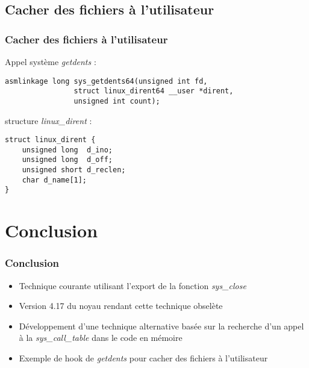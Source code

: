 \documentclass{beamer}
\begin{document}
\subsection{Cacher des fichiers à l'utilisateur}

\begin{frame}[fragile]
\frametitle{Cacher des fichiers à l'utilisateur}
Appel système \textit{getdents} :
\begin{lstlisting}[style=CStyle]
asmlinkage long sys_getdents64(unsigned int fd,
				struct linux_dirent64 __user *dirent,
				unsigned int count);
\end{lstlisting}
\medskip
structure \textit{linux\_dirent} :
\begin{lstlisting}[style=CStyle]
 struct linux_dirent {
	unsigned long  d_ino;
	unsigned long  d_off;
	unsigned short d_reclen;
	char d_name[1]; 
}
\end{lstlisting}
\end{frame}

\section{Conclusion}
\begin{frame}
\frametitle{Conclusion}
\begin{itemize}
\item 	Technique courante utilisant l'export de la fonction \textit{sys\_close}
\item 	Version 4.17 du noyau rendant cette technique obselète
\item 	Développement d'une technique alternative basée sur la recherche d'un appel à la \textit{sys\_call\_table} dans le code en mémoire
\item 	Exemple de hook de \textit{getdents} pour cacher des fichiers à l'utilisateur
\end{itemize}
\end{frame}
\end{document}
